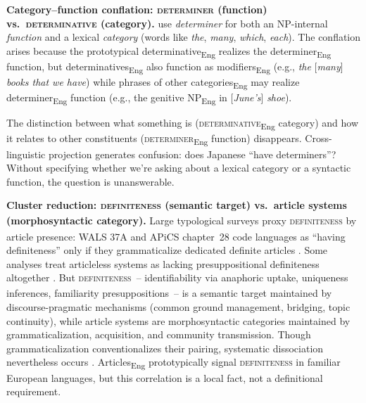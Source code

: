 \documentclass[12pt]{article}
\begin{document}
\begin{exe}
\ex\label{ex:determiner-double-duty}
\textbf{Category–function conflation: \textsc{determiner} (function) vs.~\textsc{determinative} (category).}
\textcite{QuirkEtAl1972} use \emph{determiner} for both an NP-internal \emph{function} and a lexical \emph{category} (words like \textit{the}, \textit{many}, \textit{which}, \textit{each}). The conflation arises because the prototypical determinative\textsubscript{Eng} realizes the determiner\textsubscript{Eng} function, but determinatives\textsubscript{Eng} also function as modifiers\textsubscript{Eng} (e.g., \textit{the }[\textit{many}]\textit{ books that we have}) while phrases of other categories\textsubscript{Eng} may realize determiner\textsubscript{Eng} function (e.g., the genitive NP\textsubscript{Eng} in [\textit{June's}] \textit{shoe}).

The distinction between what something is (\textsc{determinative}\textsubscript{Eng} category) and how it relates to other constituents (\textsc{determiner}\textsubscript{Eng} function) disappears. Cross-linguistic projection generates confusion: does Japanese \enquote{have determiners}? Without specifying whether we're asking about a lexical category or a syntactic function, the question is unanswerable.

\ex\label{ex:definiteness-vs-articlehood}
\textbf{Cluster reduction: \textsc{definiteness}\textsubscript{\Cross} (semantic target) vs.\ article systems (morphosyntactic category).}
Large typological surveys proxy \textsc{definiteness}\textsubscript{\Cross} by article presence: WALS 37A and APiCS chapter~28 code languages as \enquote{having definiteness} only if they grammaticalize dedicated definite articles \parencite{Dryer2013WALSDefArt,APiCS2013DefArticles}. Some analyses treat articleless systems as lacking presuppositional definiteness altogether \parencite{SimikDemian2020}. But  \textsc{definiteness}\textsubscript{\Cross}~-- identifiability via anaphoric uptake, uniqueness inferences, familiarity presuppositions~-- is a semantic target maintained by discourse-pragmatic mechanisms (common ground management, bridging, topic continuity), while article systems are morphosyntactic categories maintained by grammaticalization, acquisition, and community transmission. Though grammaticalization conventionalizes their pairing, systematic dissociation nevertheless occurs \parencite{Reynolds2025Definiteness}. Articles\textsubscript{Eng} prototypically signal \textsc{definiteness}\textsubscript{\Cross} in familiar European languages, but this correlation is a local fact, not a definitional requirement.


\end{exe}
\end{document}
